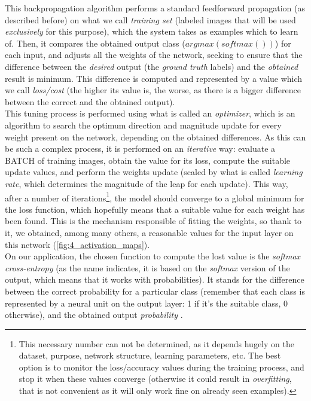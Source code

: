			This backpropagation algorithm \cite{Rumelhart1986} performs a standard feedforward propagation (as described before) on what we call \emph{training set} (labeled images that will be used \emph{exclusively} for this purpose), which the system takes as examples which to learn of. Then, it compares the obtained output class ($argmax(softmax())$) for each input, and adjusts all the weights of the network, seeking to ensure that the difference between the \emph{desired} output (the \emph{ground truth} labels) and the \emph{obtained} result is minimum. This difference is computed and represented by a value which we call \emph{loss/cost} (the higher its value is, the worse, as there is a bigger difference between the correct and the obtained output).\\
			
			This tuning process is performed using what is called an \emph{optimizer}, which is an algorithm to search the optimum direction and magnitude update for every weight present on the network, depending on the obtained differences. As this can be such a complex process, it is performed on an \emph{iterative} way: evaluate a BATCH of training images, obtain the value for its loss, compute the suitable update values, and perform the weights update (scaled by what is called \emph{learning rate}, which determines the magnitude of the leap for each update). This way, after a number of iterations\footnote{This necessary number can not be determined, as it depends hugely on the dataset, purpose, network structure, learning parameters, etc. The best option is to monitor the loss/accuracy values during the training process, and stop it when these values converge (otherwise it could result in \emph{overfitting}, that is not convenient as it will only work fine on already seen examples).}, the model should converge to a global minimum for the loss function, which hopefully means that a suitable value for each weight has been found. This is the mechanism responsible of fitting the weights, so thank to it, we obtained, among many others, a reasonable values for the input layer on this network (\autoref{fig:4_activation_maps}).\\
			
			On our application, the chosen function to compute the lost value is the \emph{softmax cross-entropy} (as the name indicates, it is based on the \emph{softmax} version of the output, which means that it works with probabilities). It stands for the difference between the correct probability for a particular class (remember that each class is represented by a neural unit on the output layer: 1 if it's the suitable class, 0 otherwise), and the obtained output \emph{probability} \cite{cross-entropy}.
			
